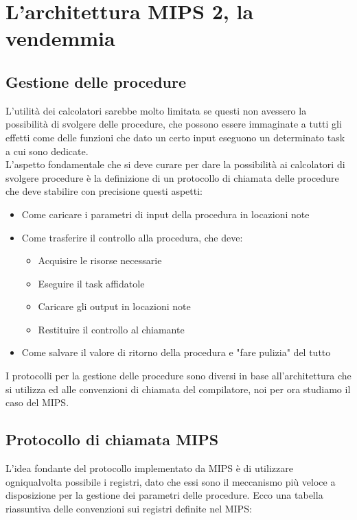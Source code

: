 \documentclass[class=book, crop=false]{standalone}
\begin{document}
\chapter{L'architettura MIPS 2, la vendemmia}
\section{Gestione delle procedure}
L'utilità dei calcolatori sarebbe molto limitata se questi non avessero la possibilità di svolgere delle procedure, che possono essere immaginate a tutti gli effetti come delle funzioni che dato un certo input eseguono un determinato task a cui sono dedicate.\\
L'aspetto fondamentale che si deve curare per dare la possibilità ai calcolatori di svolgere procedure è la definizione di un protocollo di chiamata delle procedure che deve stabilire con precisione questi aspetti:
\begin{itemize}[noitemsep]
	\item Come caricare i parametri di input della procedura in locazioni note
	\item Come trasferire il controllo alla procedura, che deve:
		\begin{itemize}[nolistsep, noitemsep]
			\item Acquisire le risorse necessarie
			\item Eseguire il task affidatole
			\item Caricare gli output in locazioni note
			\item Restituire il controllo al chiamante
		\end{itemize}
	\item Come salvare il valore di ritorno della procedura e "fare pulizia" del tutto
\end{itemize}
I protocolli per la gestione delle procedure sono diversi in base all'architettura che si utilizza ed alle convenzioni di chiamata del compilatore, noi per ora studiamo il caso del MIPS.

\section{Protocollo di chiamata MIPS}
L'idea fondante del protocollo implementato da MIPS è di utilizzare ogniqualvolta possibile i registri, dato che essi sono il meccanismo più veloce a disposizione per la gestione dei parametri delle procedure. Ecco una tabella riassuntiva delle convenzioni sui registri definite nel MIPS:
\end{document}
